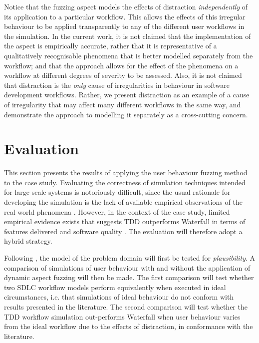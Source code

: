 \documentclass{llncs}
\begin{document}
Notice that the fuzzing aspect models the effects of distraction \emph{independently} of its application to a particular
workflow.  This allows the effects of this irregular behaviour to be applied transparently to any of the different
user workflows in the simulation. In the current work, it is not claimed that the implementation of the aspect is
empirically accurate, rather that it is representative of a qualitatively recognisable phenomena that is better modelled
separately from the workflow; and that the approach allows for the effect of the phenomena on a workflow at different
degrees of severity to be assessed.  Also, it is not claimed that distraction is the \emph{only} cause of irregularities in
behaviour in software development workflows.  Rather, we present distraction as an example of a cause of irregularity
that may affect many different workflows in the same way, and demonstrate the approach to modelling it separately as a
cross-cutting concern.
 

\section{Evaluation}
\label{sec:evaluation}


This section presents the results of applying the user behaviour fuzzing method to the case study. Evaluating the
correctness of simulation techniques intended for large scale systems is notoriously difficult, since the usual
rationale for developing the simulation is the lack of available empirical observations of the real world phenomena
\cite{naylor67verification}. However, in the context of the case study, limited empirical evidence exists that suggests
TDD outperforms Waterfall in terms of features delivered and software quality
\citep{Bhat2006TestDrivenDevelopment,George2004TestDrivenDevelopment,Huang2009EmpiricalTestFirstProgramming}. The
evaluation will therefore adopt a hybrid strategy.

Following \citet{naylor67verification}, the model of the problem domain will first be tested for \emph{plausibility}.  A
comparison of simulations of user behaviour with and without the application of dynamic aspect fuzzing will then be
made.  The first comparison will test whether two SDLC workflow models perform equivalently when executed in ideal
circumstances, i.e. that simulations of ideal behaviour do not conform with results presented in the literature. The
second comparison will test whether the TDD workflow simulation out-performs Waterfall when user behaviour varies from
the ideal workflow due to the effects of distraction, in conformance with the literature.
\end{document}

